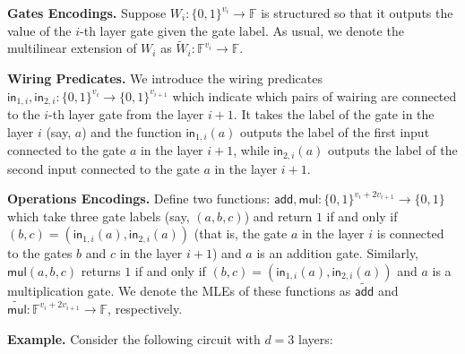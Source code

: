 \documentclass[../../book.tex]{subfiles}
\begin{document}
\textbf{Gates Encodings.} Suppose $W_i: \{0,1\}^{v_i} \to \mathbb{F}$ is
structured so that it outputs the value of the $i$-th layer gate given the gate
label. As usual, we denote the multilinear extension of $W_i$ as
$\widetilde{W}_i: \mathbb{F}^{v_i} \to \mathbb{F}$.

\textbf{Wiring Predicates.} We introduce the wiring predicates
$\mathsf{in}_{1,i}, \mathsf{in}_{2,i}: \{0,1\}^{v_i} \to \{0,1\}^{v_{i+1}}$
which indicate which pairs of wairing are connected to the $i$-th layer gate
from the layer $i+1$. It takes the label of the gate in the layer $i$ (say, $a$)
and the function $\mathsf{in}_{1,i}(a)$ outputs the label of the first input
connected to the gate $a$ in the layer $i+1$, while $\mathsf{in}_{2,i}(a)$
outputs the label of the second input connected to the gate $a$ in the layer
$i+1$.

\textbf{Operations Encodings.} Define two functions: $\mathsf{add},\mathsf{mul}:
\{0,1\}^{v_i+2v_{i+1}} \to \{0,1\}$ which take three gate labels (say,
$(a,b,c)$) and return $1$ if and only if $(b,c)=(\mathsf{in}_{1,i}(a),
\mathsf{in}_{2,i}(a))$ (that is, the gate $a$ in the layer $i$ is connected to
the gates $b$ and $c$ in the layer $i+1$) and $a$ is an addition gate.
Similarly, $\mathsf{mul}(a,b,c)$ returns $1$ if and only if
$(b,c)=(\mathsf{in}_{1,i}(a), \mathsf{in}_{2,i}(a))$ and $a$ is a multiplication
gate. We denote the MLEs of these functions as $\widetilde{\mathsf{add}}$ and
$\widetilde{\mathsf{mul}}: \mathbb{F}^{v_i+2v_{i+1}} \to \mathbb{F}$,
respectively.

\textbf{Example.} Consider the following circuit with $d=3$ layers:
\end{document}
